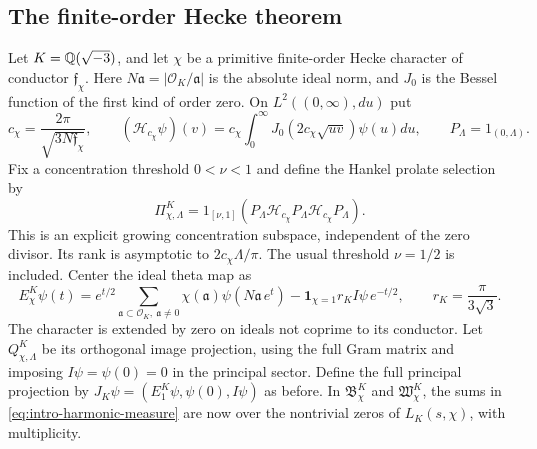 \subsection{The finite-order Hecke theorem}
Let $K=\mathbb Q(\sqrt{-3})$, and let $\chi$ be a primitive finite-order
Hecke character of conductor $\mathfrak f_\chi$. Here
$N\mathfrak a=|\mathcal O_K/\mathfrak a|$ is the absolute ideal
norm, and $J_0$ is the Bessel function of the first kind of order zero. On
$L^2((0,\infty),du)$ put
\[
 c_\chi=\frac{2\pi}{\sqrt{3N\mathfrak f_\chi}},\qquad
 (\mathcal H_{c_\chi}\psi)(v)
 =c_\chi\int_0^\infty J_0(2c_\chi\sqrt{uv})\psi(u)du,
 \qquad P_\Lambda=1_{(0,\Lambda)}.
\]
Fix a concentration threshold $0<\nu<1$ and define the Hankel
prolate selection by
\[
 \Pi_{\chi,\Lambda}^{K}
 =1_{[\nu,1]}
   (P_\Lambda\mathcal H_{c_\chi}P_\Lambda
                     \mathcal H_{c_\chi}P_\Lambda).
\]
This is an explicit growing concentration subspace, independent
of the zero divisor.
Its rank is asymptotic to $2c_\chi\Lambda/\pi$.
The usual threshold $\nu=1/2$ is included.
Center the ideal theta map as
\[
 E_\chi^K\psi(t)=e^{t/2}\sum_{\mathfrak a\subset\mathcal O_K,
                                           \ \mathfrak a\ne0}
                  \chi(\mathfrak a)\psi(N\mathfrak a\,e^t)
          -\mathbf1_{\chi=1}r_KI\psi\,e^{-t/2},
 \qquad r_K=\frac{\pi}{3\sqrt3}.
\]
The character is extended by zero on ideals not coprime to its conductor.
Let $Q^K_{\chi,\Lambda}$ be its orthogonal image projection, using
the full Gram matrix and imposing $I\psi=\psi(0)=0$ in the principal
sector. Define the full principal projection by
$J_K\psi=(E_1^K\psi,\psi(0),I\psi)$ as before.
In $\mathfrak B^K_\chi$ and $\mathfrak W^K_\chi$, the sums in
\eqref{eq:intro-harmonic-measure} are now over the nontrivial zeros
of $L_K(s,\chi)$, with multiplicity.

